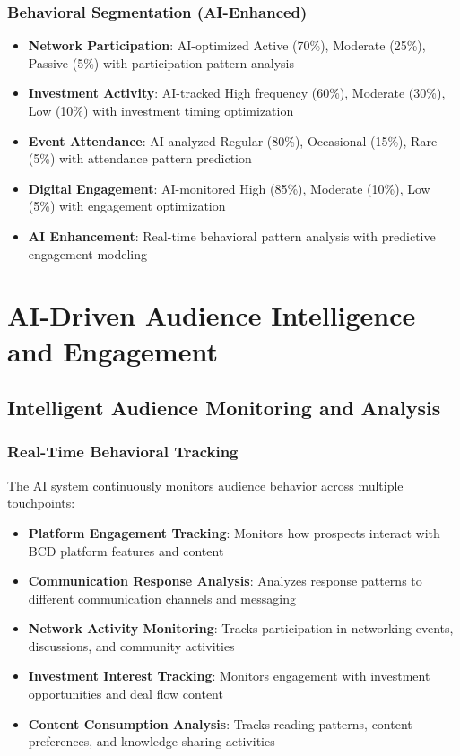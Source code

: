 \subsubsection{Behavioral Segmentation (AI-Enhanced)}

\begin{itemize}
    \item \textbf{Network Participation}: AI-optimized Active (70\%), Moderate (25\%), Passive (5\%) with participation pattern analysis
    \item \textbf{Investment Activity}: AI-tracked High frequency (60\%), Moderate (30\%), Low (10\%) with investment timing optimization
    \item \textbf{Event Attendance}: AI-analyzed Regular (80\%), Occasional (15\%), Rare (5\%) with attendance pattern prediction
    \item \textbf{Digital Engagement}: AI-monitored High (85\%), Moderate (10\%), Low (5\%) with engagement optimization
    \item \textbf{AI Enhancement}: Real-time behavioral pattern analysis with predictive engagement modeling
\end{itemize}

\section{AI-Driven Audience Intelligence and Engagement}

\subsection{Intelligent Audience Monitoring and Analysis}

\subsubsection{Real-Time Behavioral Tracking}

The AI system continuously monitors audience behavior across multiple touchpoints:

\begin{itemize}
    \item \textbf{Platform Engagement Tracking}: Monitors how prospects interact with BCD platform features and content
    \item \textbf{Communication Response Analysis}: Analyzes response patterns to different communication channels and messaging
    \item \textbf{Network Activity Monitoring}: Tracks participation in networking events, discussions, and community activities
    \item \textbf{Investment Interest Tracking}: Monitors engagement with investment opportunities and deal flow content
    \item \textbf{Content Consumption Analysis}: Tracks reading patterns, content preferences, and knowledge sharing activities
\end{itemize}

